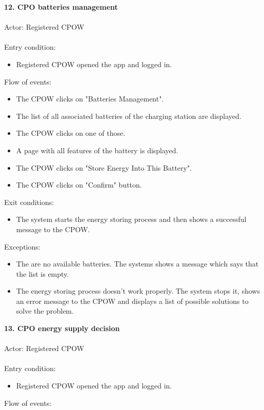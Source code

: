 \documentclass[a4paper]{report}
\begin{document}
\textbf{12. CPO batteries management}\label{uc:8}
\\ \\
Actor: Registered CPOW \\ \\
Entry condition: 
\begin{itemize}
\item Registered CPOW opened the app and logged in.
\end{itemize}
Flow of events:
\begin{itemize}
\item The CPOW clicks on "Batteries Management".
\item The list of all associated batteries of the charging station are displayed.
\item The CPOW clicks on one of those.
\item A page with all features of the battery is displayed.
\item The CPOW clicks on "Store Energy Into This Battery".
\item The CPOW clicks on "Confirm" button.
\end{itemize}
Exit conditions: 
\begin{itemize}
\item The system starts the energy storing process and then shows a successful message to the CPOW.
\end{itemize} 
Exceptions: 
\begin{itemize}
\item The are no available batteries. The systems shows a message which says that the list is empty.
\item The energy storing process doesn't work properly. The system stops it, shows an error message to the CPOW and displays a list of possible solutions to solve the problem.
\end{itemize}
\textbf{13. CPO energy supply decision}\label{uc:8}
\\ \\
Actor: Registered CPOW \\ \\
Entry condition: 
\begin{itemize}
\item Registered CPOW opened the app and logged in.
\end{itemize}
Flow of events:
\end{document}
